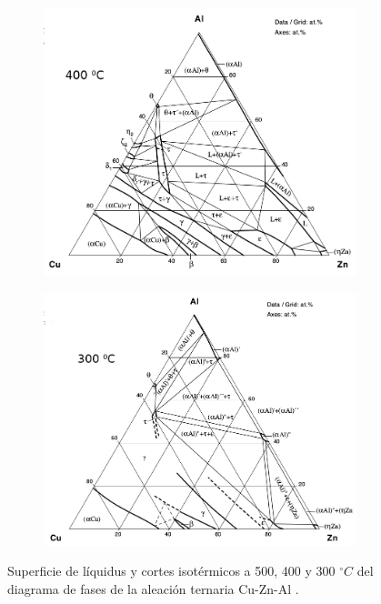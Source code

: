\documentclass[a4paper,12pt,fleqn,twoside,openany]{book}
\begin{document}
\begin{figure}
\begin{subfigure}{0.4\textwidth}
    \end{subfigure}
    \begin{subfigure}{0.4\textwidth}
        \includegraphics[width=\textwidth]{Img/Introduccion/Isoterma400.png}
    \end{subfigure}
    \begin{subfigure}{0.4\textwidth}
        \includegraphics[width=\textwidth]{Img/Introduccion/Isoterma300.png}
    \end{subfigure}
    \caption{Superficie de líquidus y cortes isotérmicos a 500, 400 y 300 $^\circ C$ del diagrama de fases de la aleación ternaria Cu-Zn-Al \cite{CuZnAl}. }
    \label{fig:CuZnAlfig}
    \end{figure}
 
\end{document}

